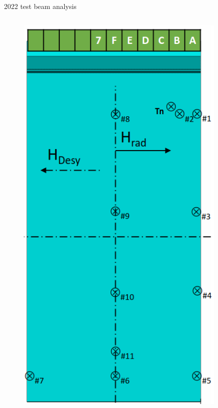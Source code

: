 \documentclass[xcolor={dvipsnames}]{beamer}
\begin{document}
\begin{frame}{2022 test beam analysis}
\begin{columns}
\begin{column}{0.3\textwidth}
\begin{figure}
        \includegraphics[width = 0.9\textwidth]{Figs/BeamPositions.png}
      \end{figure}
    \end{column}
  \end{columns}
\end{frame}
\end{document}
